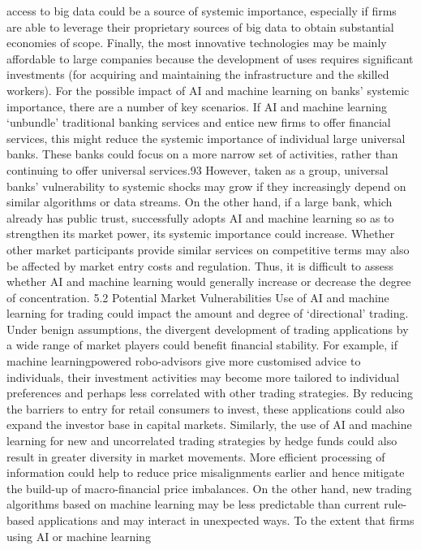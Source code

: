 \documentclass[]{article}
\begin{document}
access to big data could be a source of systemic importance, especially
if firms are able to leverage their proprietary sources of big data to
obtain substantial economies of scope. Finally, the most innovative
technologies may be mainly affordable to large companies because the
development of uses requires significant investments (for acquiring and
maintaining the infrastructure and the skilled workers). For the
possible impact of AI and machine learning on banks' systemic
importance, there are a number of key scenarios. If AI and machine
learning `unbundle' traditional banking services and entice new firms to
offer financial services, this might reduce the systemic importance of
individual large universal banks. These banks could focus on a more
narrow set of activities, rather than continuing to offer universal
services.93 However, taken as a group, universal banks' vulnerability to
systemic shocks may grow if they increasingly depend on similar
algorithms or data streams. On the other hand, if a large bank, which
already has public trust, successfully adopts AI and machine learning so
as to strengthen its market power, its systemic importance could
increase. Whether other market participants provide similar services on
competitive terms may also be affected by market entry costs and
regulation. Thus, it is difficult to assess whether AI and machine
learning would generally increase or decrease the degree of
concentration. 5.2 Potential Market Vulnerabilities Use of AI and
machine learning for trading could impact the amount and degree of
`directional' trading. Under benign assumptions, the divergent
development of trading applications by a wide range of market players
could benefit financial stability. For example, if machine
learningpowered robo-advisors give more customised advice to
individuals, their investment activities may become more tailored to
individual preferences and perhaps less correlated with other trading
strategies. By reducing the barriers to entry for retail consumers to
invest, these applications could also expand the investor base in
capital markets. Similarly, the use of AI and machine learning for new
and uncorrelated trading strategies by hedge funds could also result in
greater diversity in market movements. More efficient processing of
information could help to reduce price misalignments earlier and hence
mitigate the build-up of macro-financial price imbalances. On the other
hand, new trading algorithms based on machine learning may be less
predictable than current rule-based applications and may interact in
unexpected ways. To the extent that firms using AI or machine learning
\end{document}
